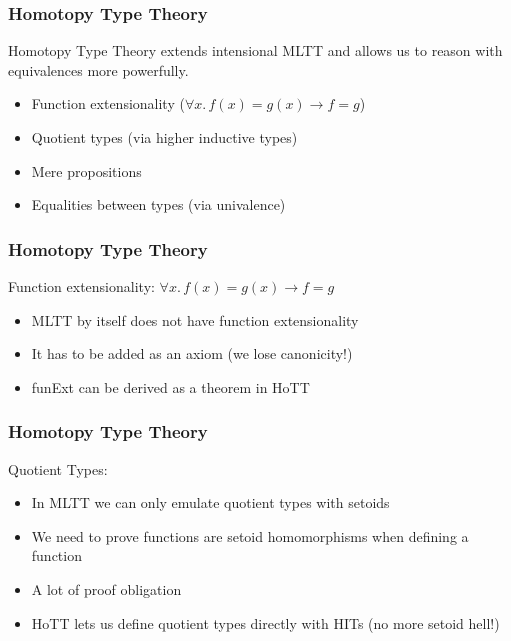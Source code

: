 \documentclass[9pt]{beamer}
\begin{document}
\begin{frame}
\frametitle{Homotopy Type Theory}

Homotopy Type Theory extends intensional MLTT and allows us to reason with equivalences more
powerfully.

\begin{itemize}

  \item Function extensionality ($\forall x. \, f(x) = g(x) \rightarrow f = g$)

  \item Quotient types (via higher inductive types)

  \item Mere propositions

  \item Equalities between types (via univalence)

\end{itemize}

\end{frame}

\begin{frame}
\frametitle{Homotopy Type Theory}

Function extensionality: $\forall x. \, f(x) = g(x) \rightarrow f = g$

\begin{itemize}

  \item MLTT by itself does not have function extensionality

  \item It has to be added as an axiom (we lose canonicity!)

  \item<2-> funExt can be derived as a theorem in HoTT

\end{itemize}

\end{frame}

\begin{frame}
\frametitle{Homotopy Type Theory}

Quotient Types:

\begin{itemize}

  \item In MLTT we can only emulate quotient types with setoids
  \item We need to prove functions are setoid homomorphisms when defining a function
  \item A lot of proof obligation
  \item<2-> HoTT lets us define quotient types directly with HITs (no more setoid hell!)

\end{itemize}

\end{frame}
\end{document}

